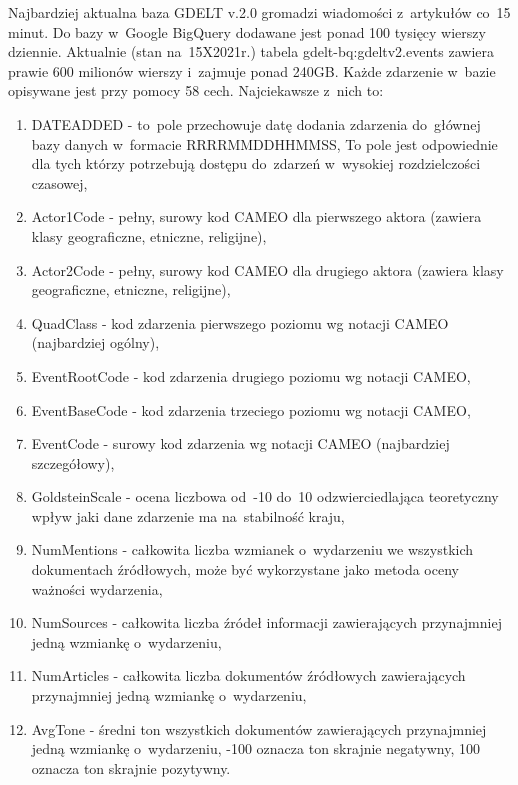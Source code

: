 \documentclass[11pt]{report}
\begin{document}
    Najbardziej aktualna baza GDELT v.\@ 2.0 gromadzi wiadomości z~artykułów co~15 minut.
    Do bazy w~Google BigQuery dodawane jest ponad 100 tysięcy wierszy dziennie.
    Aktualnie (stan na~15X2021r.) tabela gdelt-bq:gdeltv2.events zawiera prawie 600 milionów wierszy
    i~zajmuje ponad 240GB\@.
    Każde zdarzenie w~bazie opisywane jest przy pomocy 58 cech.
    Najciekawsze z~nich to:
    \begin{enumerate}
        \item DATEADDED - to~pole przechowuje datę dodania zdarzenia do~głównej bazy danych w~formacie RRRRMMDDHHMMSS,
        To pole jest odpowiednie dla tych którzy potrzebują dostępu do~zdarzeń w~wysokiej rozdzielczości czasowej,
        \item Actor1Code - pełny, surowy kod CAMEO dla pierwszego aktora (zawiera klasy geograficzne, etniczne, religijne),
        \item Actor2Code - pełny, surowy kod CAMEO dla drugiego aktora (zawiera klasy geograficzne, etniczne, religijne),
        \item QuadClass - kod zdarzenia pierwszego poziomu wg notacji CAMEO (najbardziej ogólny),
        \item EventRootCode - kod zdarzenia drugiego poziomu wg notacji CAMEO,
        \item EventBaseCode - kod zdarzenia trzeciego poziomu wg notacji CAMEO,
        \item EventCode - surowy kod zdarzenia wg notacji CAMEO (najbardziej szczegółowy),
        \item GoldsteinScale - ocena liczbowa od~-10 do~10 odzwierciedlająca teoretyczny wpływ jaki dane zdarzenie ma na~stabilność kraju,
        \item NumMentions - całkowita liczba wzmianek o~wydarzeniu we wszystkich dokumentach źródłowych,
        może być wykorzystane jako metoda oceny ważności wydarzenia,
        \item NumSources - całkowita liczba źródeł informacji zawierających przynajmniej jedną wzmiankę o~wydarzeniu,
        \item NumArticles - całkowita liczba dokumentów źródłowych zawierających przynajmniej jedną wzmiankę o~wydarzeniu,
        \item AvgTone - średni ton wszystkich dokumentów zawierających przynajmniej jedną wzmiankę o~wydarzeniu,
        -100 oznacza ton skrajnie negatywny, 100 oznacza ton skrajnie pozytywny.
    \end{enumerate}
\end{document}
